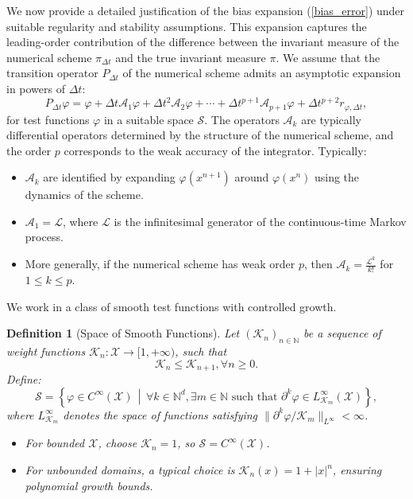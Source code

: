 \documentclass[11pt, twoside]{report}
\newtheorem{definition}[theorem]{Definition}
\begin{document}
We now provide a detailed justification of the bias expansion (\ref{bias_error}) under suitable regularity and stability assumptions. This expansion captures the leading-order contribution of the difference between the invariant measure of the numerical scheme $\pi_{\Delta t}$ and the true invariant measure $\pi$. We assume that the transition operator $P_{\Delta t}$ of the numerical scheme admits an asymptotic expansion in powers of $\Delta t$:
\[
P_{\Delta t} \varphi = \varphi + \Delta t \mathcal{A}_1 \varphi + \Delta t^2 \mathcal{A}_2 \varphi + \cdots + \Delta t^{p+1} \mathcal{A}_{p+1} \varphi + \Delta t^{p+2} r_{\varphi, \Delta t},
\]
for test functions $\varphi$ in a suitable space $\mathcal{S}$. The operators $\mathcal{A}_k$ are typically differential operators determined by the structure of the numerical scheme, and the order $p$ corresponds to the weak accuracy of the integrator. Typically:
\begin{itemize}
    \item $\mathcal{A}_k$ are identified by expanding $\varphi(x^{n+1})$ around $\varphi(x^n)$ using the dynamics of the scheme.
    \item $\mathcal{A}_1 = \mathcal{L}$, where $\mathcal{L}$ is the infinitesimal generator of the continuous-time Markov process.
    \item More generally, if the numerical scheme has weak order $p$, then $\mathcal{A}_k = \frac{\mathcal{L}^k}{k!}$ for $1 \leq k \leq p$.
\end{itemize}  
We work in a class of smooth test functions with controlled growth.
\begin{definition}[Space of Smooth Functions]
Let $(\mathcal{K}_n)_{n \in \mathbb{N}}$ be a sequence of weight functions $\mathcal{K}_n : \mathcal{X} \to [1, +\infty)$, such that
\[\mathcal{K}_n \leq \mathcal{K}_{n+1}, \forall n \geq 0.\]
Define:
\[
\mathcal{S} = \left\{ \varphi \in C^\infty(\mathcal{X}) \,\middle|\, \forall k \in \mathbb{N}^d, \exists m \in \mathbb{N} \text{ such that } \partial^k \varphi \in L^\infty_{\mathcal{K}_m}(\mathcal{X}) \right\},
\]
where $L^\infty_{\mathcal{K}_m}$ denotes the space of functions satisfying $\|\partial^k \varphi / \mathcal{K}_m\|_{L^\infty} < \infty$.

\begin{itemize}
    \item For bounded $\mathcal{X}$, choose $\mathcal{K}_n = 1$, so $\mathcal{S} = C^\infty(\mathcal{X})$.
    \item For unbounded domains, a typical choice is $\mathcal{K}_n(x) = 1 + |x|^n$, ensuring polynomial growth bounds.
\end{itemize}
\end{definition}
\end{document}
